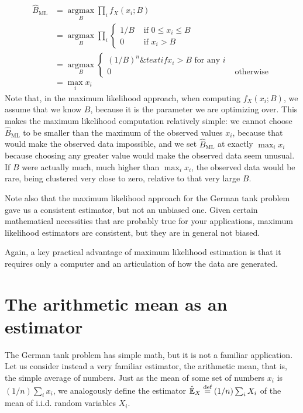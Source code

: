 \begin{align*}
    \hat{B}_\mathrm{ML}
    &= \underset{B}{\operatorname{argmax}} \prod_i f_X(x_i; B) \\
    &= \underset{B}{\operatorname{argmax}} \prod_i \begin{cases}
      1/B &\text{ if } 0 \leq x_i \leq B \\
      0 &\text{ if } x_i > B
    \end{cases} \\
    &= \underset{B}{\operatorname{argmax}} \begin{cases}
      (1/B)^n \& text{ if } x_i > B \text{ for any $i$} \\
      0 &\text{ otherwise}
     \end{cases} \\
    &= \max_i x_i
\end{align*}
Note that, in the maximum likelihood approach, when computing $f_X(x_i; B)$, we assume that we know $B$, because it is the parameter we are optimizing over. This makes the maximum likelihood computation relatively simple: we cannot choose $\hat{B}_\mathrm{ML}$ to be smaller than the maximum of the observed values $x_i$, because that would make the observed data impossible, and we set $\hat{B}_\mathrm{ML}$ at exactly $\max_i x_i$ because choosing any greater value would make the observed data seem unusual. If $B$ were actually much, much higher than $\max_i x_i$, the observed data would be rare, being clustered very close to zero, relative to that very large $B$.

Note also that the maximum likelihood approach for the German tank problem gave us a consistent estimator, but not an unbiased one. Given certain mathematical necessities that are probably true for your applications, maximum likelihood estimators are consistent, but they are in general not biased.

Again, a key practical advantage of maximum likelihood estimation is that it requires only a computer and an articulation of how the data are generated.


\section{The arithmetic mean as an estimator}

The German tank problem has simple math, but it is not a familiar application. Let us consider instead a very familiar estimator, the arithmetic mean, that is, the simple average of numbers. Just as the mean of some set of numbers $x_i$ is $(1/n) \sum_i x_i$, we analogously define the estimator $\hat{\mathbb{E}}_X \stackrel{\text{def}}{=} (1/n) \sum_i X_i$ of the mean of i.i.d. random variables $X_i$.

